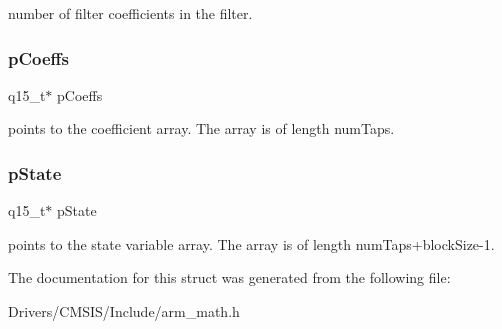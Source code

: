 number of filter coefficients in the filter. \mbox{\label{structarm__fir__instance__q15_a7ca181a37f714d174445f486bebce26f}} 
\subsubsection{\texorpdfstring{p\+Coeffs}{pCoeffs}}
{\footnotesize\ttfamily q15\+\_\+t$\ast$ p\+Coeffs}

points to the coefficient array. The array is of length num\+Taps. \mbox{\label{structarm__fir__instance__q15_ae29dfdb736374fcddaeaec4b7770170c}} 
\subsubsection{\texorpdfstring{p\+State}{pState}}
{\footnotesize\ttfamily q15\+\_\+t$\ast$ p\+State}

points to the state variable array. The array is of length num\+Taps+block\+Size-\/1. 

The documentation for this struct was generated from the following file\+:\begin{DoxyCompactItemize}
\item 
Drivers/\+C\+M\+S\+I\+S/\+Include/arm\+\_\+math.\+h\end{DoxyCompactItemize}
